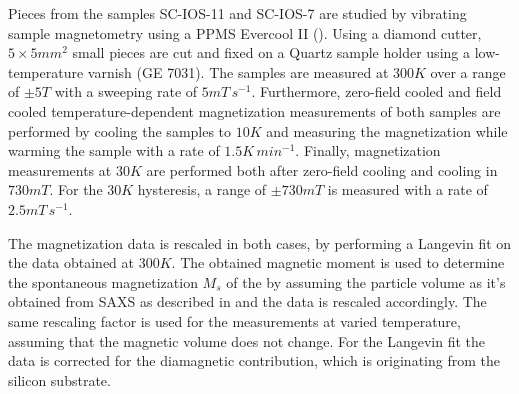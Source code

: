 \documentclass[\main/dresen_thesis.tex]{subfiles}
\begin{document}
    Pieces from the samples SC-IOS-11 and SC-IOS-7 are studied by vibrating sample magnetometry using a PPMS Evercool II ().
    Using a diamond cutter, $5 \times 5 \unit{mm^2}$ small pieces are cut and fixed on a Quartz sample holder using a low-temperature varnish (GE 7031).
    The samples are measured at $300 \unit{K}$ over a range of $\pm 5 \unit{T}$ with a sweeping rate of $5 \unit{mT \, s^{-1}}$.
    Furthermore, zero-field cooled and field cooled temperature-dependent magnetization measurements of both samples are performed by cooling the samples to $10 \unit{K}$ and measuring the magnetization while warming the sample with a rate of $1.5 \unit{K \, min^{-1}}$.
    Finally, magnetization measurements at $30 \unit{K}$ are performed both after zero-field cooling and cooling in $730 \unit{mT}$.
    For the $30 \unit{K}$ hysteresis, a range of $\pm 730 \unit{mT}$ is measured with a rate of $2.5 \unit{mT \, s^{-1}}$.

    The magnetization data is rescaled in both cases, by performing a Langevin fit on the data obtained at $300 \unit{K}$.
    The obtained magnetic moment is used to determine the spontaneous magnetization $M_s$ of the by assuming the particle volume as it's obtained from SAXS as described in  and the data is rescaled accordingly.
    The same rescaling factor is used for the measurements at varied temperature, assuming that the magnetic volume does not change.
    For the Langevin fit the data is corrected for the diamagnetic contribution, which is originating from the silicon substrate.
\end{document}
